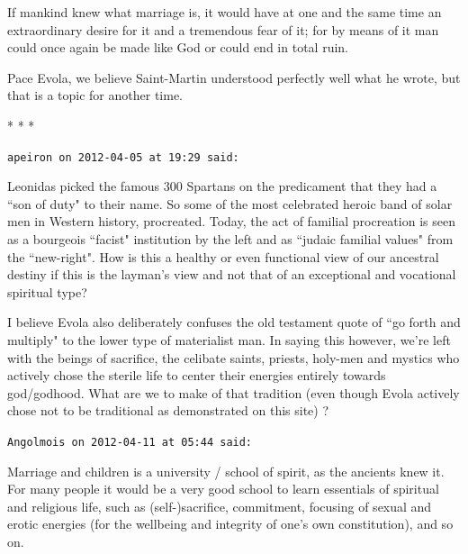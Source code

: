 \begin{quotex}
If mankind knew what marriage is, it would have at one and the same time an extraordinary desire for it and a tremendous fear of it; for by means of it man could once again be made like God or could end in total ruin. 

\end{quotex}
Pace Evola, we believe Saint-Martin understood perfectly well what he wrote, but that is a topic for another time.




\begin{center}* * *\end{center}

\begin{footnotesize}\begin{sffamily}



\texttt{apeiron on 2012-04-05 at 19:29 said: }

Leonidas picked the famous 300 Spartans on the predicament that they had a ``son of duty" to their name. So some of the most celebrated heroic band of solar men in Western history, procreated. Today, the act of familial procreation is seen as a bourgeois ``facist" institution by the left and as ``judaic familial values" from the ``new-right". How is this a healthy or even functional view of our ancestral destiny if this is the layman's view and not that of an exceptional and vocational spiritual type? 

I believe Evola also deliberately confuses the old testament quote of ``go forth and multiply" to the lower type of materialist man. In saying this however, we're left with the beings of sacrifice, the celibate saints, priests, holy-men and mystics who actively chose the sterile life to center their energies entirely towards god/godhood. What are we to make of that tradition (even though Evola actively chose not to be traditional as demonstrated on this site) ?


\hfill

\texttt{Angolmois on 2012-04-11 at 05:44 said: }

Marriage and children is a university / school of spirit, as the ancients knew it. For many people it would be a very good school to learn essentials of spiritual and religious life, such as (self-)sacrifice, commitment, focusing of sexual and erotic energies (for the wellbeing and integrity of one's own constitution), and so on.


\end{sffamily}
\end{footnotesize}
